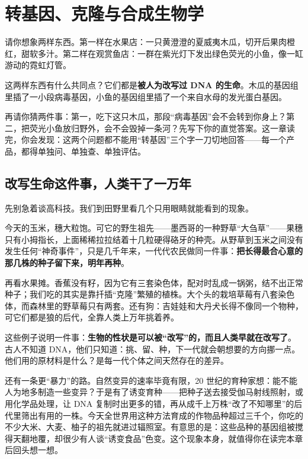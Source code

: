 \chapter{转基因、克隆与合成生物学}

\begin{kaichang}
请你想象两样东西。第一样在水果店：一只黄澄澄的夏威夷木瓜，切开后果肉橙红，甜软多汁。第二样在观赏鱼店：一群在紫光灯下发出绿色荧光的小鱼，像一缸游动的霓虹灯管。

这两样东西有什么共同点？它们都是\textbf{被人为改写过 DNA 的生命}。木瓜的基因组里插了一小段病毒基因，小鱼的基因组里插了一个来自水母的发光蛋白基因。

再请你猜两件事：第一，吃下这只木瓜，那段“病毒基因”会不会转到你身上？第二，把荧光小鱼放归野外，会不会毁掉一条河？先写下你的直觉答案。这一章读完，你会发现：这两个问题都不能用“转基因”三个字一刀切地回答——每一个产品，都得单独问、单独查、单独评估。
\end{kaichang}

\section{改写生命这件事，人类干了一万年}

先别急着谈高科技。我们到田野里看几个只用眼睛就能看到的现象。

今天的玉米，穗大粒饱。可它的野生祖先——墨西哥的一种野草“大刍草”——果穗只有小拇指长，上面稀稀拉拉结着十几粒硬得硌牙的种壳。从野草到玉米之间没有发生任何“神奇事件”，只是几千年来，一代代农民做同一件事：\textbf{把长得最合心意的那几株的种子留下来，明年再种}。

再看水果摊。香蕉没有籽，因为它有三套染色体，配对时乱成一锅粥，结不出正常种子；我们吃的其实是靠扦插“克隆”繁殖的植株。大个头的栽培草莓有八套染色体，而森林里的野草莓只有两套。还有狗：吉娃娃和大丹犬长得不像同一个物种，可它们都是狼的后代，全靠人类上万年挑着养。

这些例子说明一件事：\textbf{生物的性状是可以被“改写”的，而且人类早就在改写了}。古人不知道 DNA，他们只知道：挑、留、种，下一代就会朝想要的方向挪一点。他们用的原材料是什么？是每一代个体之间天然存在的差异。

还有一条更“暴力”的路。自然变异的速率毕竟有限，20 世纪的育种家想：能不能人为地多制造一些变异？于是有了诱变育种——把种子送去接受伽马射线照射，或用化学品处理，让 DNA 复制时出更多的错，再从成千上万株“改了不知哪里”的后代里筛出有用的一株。今天全世界用这种方法育成的作物品种超过三千个，你吃的不少大米、大麦、柚子的祖先就进过辐照室。有意思的是：这些品种的基因组被搅得天翻地覆，却很少有人谈“诱变食品”色变。这个现象本身，就值得你在读完本章后回头想一想。

